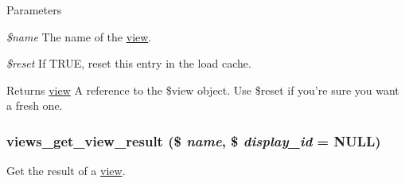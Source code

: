 \begin{DoxyParams}{Parameters}
\item[{\em \$name}]The name of the \hyperlink{classview}{view}. \item[{\em \$reset}]If TRUE, reset this entry in the load cache. \end{DoxyParams}
\begin{DoxyReturn}{Returns}
\hyperlink{classview}{view} A reference to the \$view object. Use \$reset if you're sure you want a fresh one. 
\end{DoxyReturn}
\hypertarget{views_8module_a176654fda08f5f0fcb5c8d5e41de5078}{
\subsubsection[{views\_\-get\_\-view\_\-result}]{\setlength{\rightskip}{0pt plus 5cm}views\_\-get\_\-view\_\-result (\$ {\em name}, \/  \$ {\em display\_\-id} = {\ttfamily NULL})}}
\label{views_8module_a176654fda08f5f0fcb5c8d5e41de5078}
Get the result of a \hyperlink{classview}{view}.


